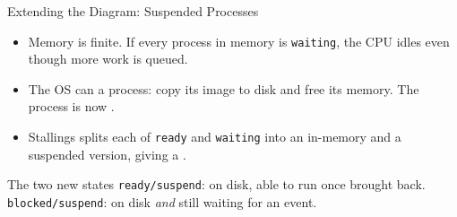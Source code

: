 \documentclass[aspectratio=169]{beamer}
\begin{document}
\begin{frame}{Extending the Diagram: Suspended Processes}
  \begin{itemize}
    \item Memory is finite. If every process in memory is \texttt{waiting},
      the CPU idles even though more work is queued.
    \item The OS can  a process: copy its image to disk and
      free its memory. The process is now .
    \item Stallings splits each of \texttt{ready} and \texttt{waiting} into an
      in-memory and a suspended version, giving a .
  \end{itemize}
  \vspace{0.2cm}
  \begin{block}{The two new states}
    \texttt{ready/suspend}: on disk, able to run once brought back.\\
    \texttt{blocked/suspend}: on disk \emph{and} still waiting for an event.
  \end{block}
\end{frame}
\end{document}
